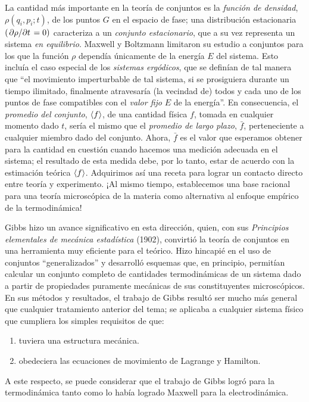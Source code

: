 La cantidad más importante en la teoría de conjuntos es la \emph{función de densidad}, $\rho (q_{i}, p_{i} ; t)$, de los puntos $G$ en el espacio de fase; una distribución estacionaria $(\pdv*{\rho}{t} = 0)$ caracteriza a un \emph{conjunto estacionario}, que a su vez representa un sistema \emph{en equilibrio}. Maxwell y Boltzmann limitaron su estudio a conjuntos para los que la función $\rho$ dependía únicamente de la energía $E$ del sistema. Esto incluía el caso especial de los \emph{sistemas ergódicos}, que se definían de tal manera que \enquote{el movimiento imperturbable de tal sistema, si se prosiguiera durante un tiempo ilimitado, finalmente atravesaría (la vecindad de) todos y cada uno de los puntos de fase compatibles con el \emph{valor fijo} $E$ de la energía}. En consecuencia, el \emph{promedio del conjunto}, $\expval{f}$, de una cantidad física $f$, tomada en cualquier momento dado $t$, sería el mismo que el \emph{promedio de largo plazo}, $\bar{f}$, perteneciente a cualquier miembro dado del conjunto. Ahora, $\bar{f}$ es el valor que esperamos obtener para la cantidad en cuestión cuando hacemos una medición adecuada en el sistema; el resultado de esta medida debe, por lo tanto, estar de acuerdo con la estimación teórica $\expval{f}$. Adquirimos así una receta para lograr un contacto directo entre teoría y experimento. ¡Al mismo tiempo, establecemos una base racional para una teoría microscópica de la materia como alternativa al enfoque empírico de la termodinámica!
\par
Gibbs hizo un avance significativo en esta dirección, quien, con sus \emph{Principios elementales de mecánica estadística} (1902), convirtió la teoría de conjuntos en una herramienta muy eficiente para el teórico. Hizo hincapié en el uso de conjuntos \enquote{generalizados} y desarrolló esquemas que, en principio, permitían calcular un conjunto completo de cantidades termodinámicas de un sistema dado a partir de propiedades puramente mecánicas de sus constituyentes microscópicos. En sus métodos y resultados, el trabajo de Gibbs resultó ser mucho más general que cualquier tratamiento anterior del tema; se aplicaba a cualquier sistema físico que cumpliera los simples requisitos de que:
\begin{enumerate}[label=\roman*)]
\item tuviera una estructura mecánica.
\item obedeciera las ecuaciones de movimiento de Lagrange y Hamilton.
\end{enumerate}
A este respecto, se puede considerar que el trabajo de Gibbs logró para la termodinámica tanto como lo había logrado Maxwell para la electrodinámica.
